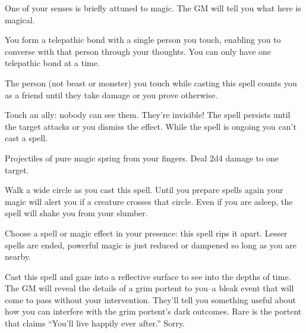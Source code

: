  One of your senses is briefly attuned to magic. The GM will tell you what here is magical.





 You form a telepathic bond with a single person you touch, enabling you to converse with that person through your thoughts. You can only have one telepathic bond at a time.





 The person (not beast or monster) you touch while casting this spell counts you as a friend until they take damage or you prove otherwise.





 Touch an ally: nobody can see them. They're invisible! The spell persists until the target attacks or you dismiss the effect. While the spell is ongoing you can't cast a spell.





 Projectiles of pure magic spring from your fingers. Deal 2d4 damage to one target.




 Walk a wide circle as you cast this spell. Until you prepare spells again your magic will alert you if a creature crosses that circle. Even if you are asleep, the spell will shake you from your slumber.




 Choose a spell or magic effect in your presence: this spell rips it apart. Lesser spells are ended, powerful magic is just reduced or dampened so long as you are nearby.





 Cast this spell and gaze into a reflective surface to see into the depths of time. The GM will reveal the details of a grim portent to you--a bleak event that will come to pass without your intervention. They'll tell you something useful about how you can interfere with the grim portent's dark outcomes. Rare is the portent that claims ``You'll live happily ever after.'' Sorry.




